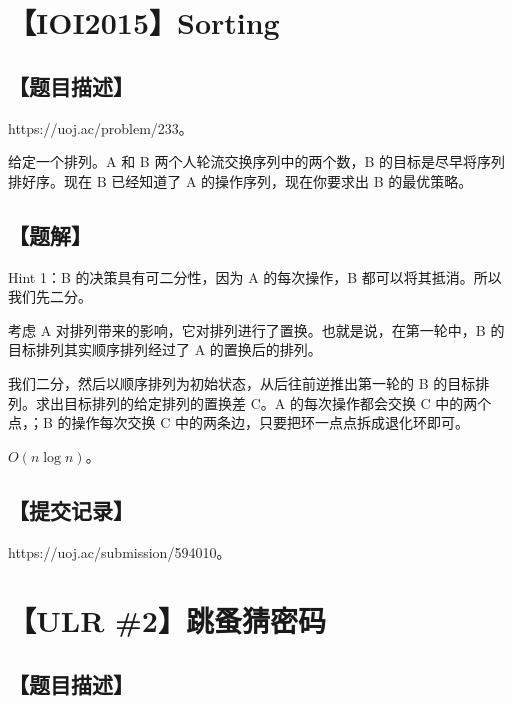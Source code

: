 \documentclass[UTF8,12pt,a4paper]{ctexart}
\newcommand{\stress}[1]{\textbf{\CJKunderdot{#1}}}
\begin{document}
	
	
	\section*{【IOI2015】Sorting}
	
	\subsection*{【题目描述】}
	
	https://uoj.ac/problem/233。
	
	给定一个排列。A 和 B 两个人轮流交换序列中的两个数，B 的目标是尽早将序列排好序。现在 B 已经知道了 A 的操作序列，现在你要求出 B 的最优策略。
	
	\subsection*{【题解】}
	
	Hint 1：B 的决策具有可二分性，因为 A 的每次操作，B 都可以将其抵消。所以我们先二分。
	
	考虑 A 对排列带来的影响，它对排列进行了置换。也就是说，在第一轮中，B 的目标排列其实顺序排列经过了 A 的置换后的排列。
	
	我们二分，然后以顺序排列为初始状态，从后往前逆推出第一轮的 B 的目标排列。求出目标排列的给定排列的置换差 C。A 的每次操作都会交换 C 中的两个点，\stress{但是不改变 C 的形态}；B 的操作每次交换 C 中的两条边，只要把环一点点拆成退化环即可。
	
	$O(n\log n)$。
	
	\subsection*{【提交记录】}
	
	https://uoj.ac/submission/594010。
	
	
	\section*{【ULR \#2】跳蚤猜密码}
	
	\subsection*{【题目描述】}
	
\end{document}

